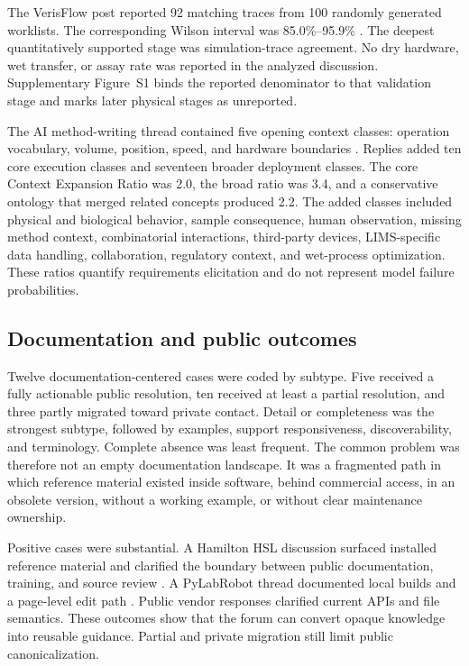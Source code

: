 The VerisFlow post reported 92 matching traces from 100 randomly generated worklists. The corresponding Wilson interval was 85.0\%--95.9\% \cite{forum_verisflow}. The deepest quantitatively supported stage was simulation-trace agreement. No dry hardware, wet transfer, or assay rate was reported in the analyzed discussion. Supplementary Figure~S1 binds the reported denominator to that validation stage and marks later physical stages as unreported.

The AI method-writing thread contained five opening context classes: operation vocabulary, volume, position, speed, and hardware boundaries \cite{forum_ai_method}. Replies added ten core execution classes and seventeen broader deployment classes. The core Context Expansion Ratio was 2.0, the broad ratio was 3.4, and a conservative ontology that merged related concepts produced 2.2. The added classes included physical and biological behavior, sample consequence, human observation, missing method context, combinatorial interactions, third-party devices, LIMS-specific data handling, collaboration, regulatory context, and wet-process optimization. These ratios quantify requirements elicitation and do not represent model failure probabilities.

\subsection{Documentation and public outcomes}

Twelve documentation-centered cases were coded by subtype. Five received a fully actionable public resolution, ten received at least a partial resolution, and three partly migrated toward private contact. Detail or completeness was the strongest subtype, followed by examples, support responsiveness, discoverability, and terminology. Complete absence was least frequent. The common problem was therefore not an empty documentation landscape. It was a fragmented path in which reference material existed inside software, behind commercial access, in an obsolete version, without a working example, or without clear maintenance ownership.

Positive cases were substantial. A Hamilton HSL discussion surfaced installed reference material and clarified the boundary between public documentation, training, and source review \cite{forum_hsl_learning}. A PyLabRobot thread documented local builds and a page-level edit path \cite{forum_plr_docs}. Public vendor responses clarified current APIs and file semantics. These outcomes show that the forum can convert opaque knowledge into reusable guidance. Partial and private migration still limit public canonicalization.

